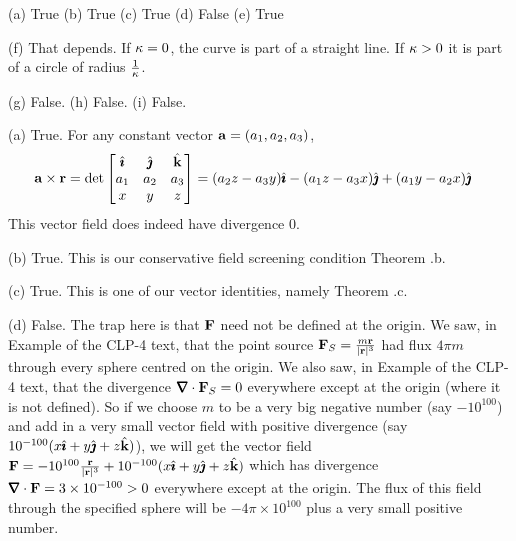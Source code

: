 %

\begin{answer} 
(a) True\quad
(b) True\quad
(c) True\quad
(d) False\quad
(e) True

(f) That depends. If $\kappa=0$, the curve is part of a straight
line. If $\kappa>0$ it is part of a circle of radius $\frac{1}{\kappa}$.

(g) False.\quad
(h) False.\quad
(i) False.
\end{answer}

\begin{solution} (a) True.
For any constant vector $\mathbf{a}=(a_1,a_2,a_3)$,
\begin{align*}
\mathbf{a}\times\mathbf{r}
&=\det\left[\begin{matrix}
\hat{\pmb{\imath}} &\hat{\pmb{\jmath}} &\hat{\mathbf{k}} \\
a_1 & a_2 & a_3 \\
x   &  y  & z
\end{matrix}
\right]
= (a_2 z - a_3 y)\hat{\pmb{\imath}} 
 -(a_1 z - a_3 x)\hat{\pmb{\jmath}}
 +(a_1 y - a_2 x)\hat{\pmb{\jmath}}
\end{align*}
This vector field does indeed have divergence $0$.

\noindent (b) True. This is our conservative field screening condition
Theorem .b.

\noindent (c) True. This is one of our vector identities, namely
Theorem .c.

\noindent (d) False. The trap here is that $\mathbf{F}$ need not be defined
at the origin. We saw, in Example  of the CLP-4 text, that the point source $\mathbf{F}_S=\frac{m\mathbf{r}}{|\mathbf{r}|^3}$ had flux 
$4\pi m$ through every sphere centred on the  origin. We also saw,
in Example  of the CLP-4 text, that the divergence
$\vnabla\cdot\vF_S=0$ everywhere except at the origin (where it is not defined).
So if we choose $m$ to be a very big negative number (say $-10^{100}$)
and add in a very small vector field with positive divergence 
(say $ 10^{-100}(x\hat{\pmb{\imath}}+y\hat{\pmb{\jmath}} +z\hat{\mathbf{k}})$), we will get the vector field
$\mathbf{F} = -10^{100}\frac{\mathbf{r}}{|\mathbf{r}|^3} + 10^{-100}(x\hat{\pmb{\imath}}+y\hat{\pmb{\jmath}} +z\hat{\mathbf{k}})$
which has divergence $\vnabla\cdot\vF=3\times 10^{-100}>0$ everywhere
except at the origin. The flux of this field through the specified sphere will
be $-4\pi\times 10^{100}$ plus a very small positive number. 


\end{solution}
